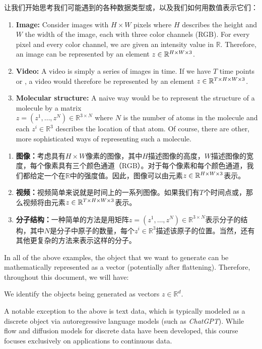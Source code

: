 让我们开始思考我们可能遇到的各种数据类型或，以及我们如何用数值表示它们：
\begin{enumerate}
    \item \textbf{\sffamily Image: }Consider images with $H \times W$ pixels where $H$ describes the height and $W$ the width of the image, each with three color channels (RGB). For every pixel and every color channel, we are given an intensity value in $\mathbb{R}$. Therefore, an image can be represented by an element $z\in\mathbb{R}^{H \times W \times 3}$.
    \item \textbf{\sffamily Video: }A video is simply a series of images in time. If we have $T$ time points or , a video would therefore be represented by an element $z\in\mathbb{R}^{T\times H \times W \times 3}$.
    \item \textbf{\sffamily Molecular structure: }A naive way would be to represent the structure of a molecule by a matrix \\$z=(z^1,\dots,z^N)\in\mathbb{R}^{3\times N}$ where $N$ is the number of atoms in the molecule and each $z^i\in\mathbb{R}^3$ describes the location of that atom. Of course, there are other, more sophisticated ways of representing such a molecule.
\end{enumerate}

\begin{enumerate}
    \item \textbf{\sffamily 图像：}考虑具有$H \times W$像素的图像，其中$H$描述图像的高度，$W$描述图像的宽度，每个像素具有三个颜色通道（RGB）。对于每个像素和每个颜色通道，我们都给定一个在$\mathbb{R}$中的强度值。因此，图像可以由元素$z\in\mathbb{R}^{H \times W \times 3}$表示。
    \item \textbf{\sffamily 视频：}视频简单来说就是时间上的一系列图像。如果我们有$T$个时间点或，那么视频将由元素$z\in\mathbb{R}^{T\times H \times W \times 3}$表示。
    \item \textbf{\sffamily 分子结构：}一种简单的方法是用矩阵$z=(z^1,\dots,z^N)\in\mathbb{R}^{3\times N}$表示分子的结构，其中$N$是分子中原子的数量，每个$z^i\in\mathbb{R}^3$描述该原子的位置。当然，还有其他更复杂的方法来表示这样的分子。
\end{enumerate}
In all of the above examples, the object that we want to generate can be mathematically represented as a vector (potentially after flattening). Therefore, throughout this document, we will have:
\begin{ideabox}
    We identify the objects being generated as vectors $z \in \mathbb{R}^d$.
\end{ideabox}
A notable exception to the above is text data, which is typically modeled as a discrete object via autoregressive language models (such as \emph{ChatGPT}). While flow and diffusion models for discrete data have been developed, this course focuses exclusively on applications to continuous data.

